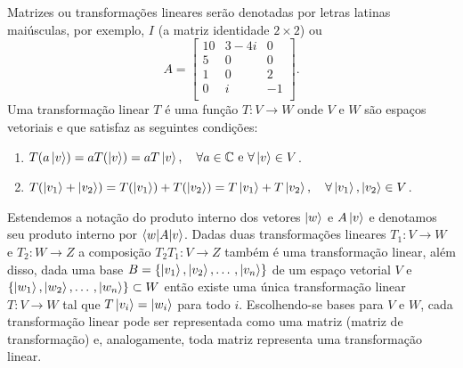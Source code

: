 Matrizes ou transformações lineares serão denotadas por letras latinas maiúsculas, por exemplo, $I$ (a matriz identidade $2\times 2$) ou
%
\begin{equation}\label{eq:ma}
	A = \begin{bmatrix}
		10 & 3-4i &  0 \\
		5  & 0    &  0 \\
		1  & 0    &  2 \\
		0  & i    & -1 \\
	\end{bmatrix}.
\end{equation}
%
Uma transformação linear $T$ é uma função $T: V\to W$ onde $V$ e $W$ são espaços vetoriais e que satisfaz as seguintes condições:
\begin{enumerate}
	\item $T(a\ket{v}) = aT(\ket{v}) = aT\ket{v}, \quad \forall a\in \mathbb{C} \text{ e } \forall \ket{v} \in V$.
	\item $T(\ket{v_1}+\ket{v_2}) = T(\ket{v_1})+ T(\ket{v_2})=T\ket{v_1}+ T\ket{v_2}, \quad \forall \ket{v_1}, \ket{v_2}\in V$.
\end{enumerate}
%
Estendemos a notação do produto interno dos vetores $\ket{w}$ e $A\ket{v}$ e denotamos seu produto interno por $\braket{w|A|v}$. Dadas duas transformações lineares $T_1: V \to W$ e $T_2: W \to Z$ a composição $T_2T_1: V \to Z$ também é uma transformação linear, além disso, dada uma base $B=\{\ket{v_1}, \ket{v_2}, \dotso, \ket{v_n}\}$ de um espaço vetorial $V$ e $\{\ket{w_1}, \ket{w_2}, \dotso, \ket{w_n}\}\subset W$ então existe uma única transformação linear $T: V \to W$ tal que $T\ket{v_i}=\ket{w_i}$ para todo $i$. Escolhendo-se bases para $V$ e $W$, cada transformação linear pode ser representada como uma matriz (matriz de transformação) e, analogamente, toda matriz representa uma transformação linear.

